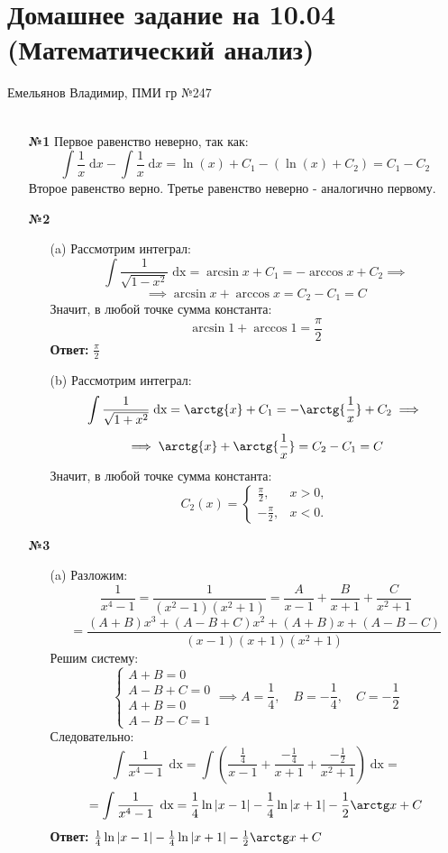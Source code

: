 \documentclass[a4paper]{article}
\renewcommand{\f}[2]{\frac{#1}{#2}}
\newcommand{\case}[1]{\begin{cases} #1 \end{cases}}
\renewcommand{\l}{\left(}
\renewcommand{\r}{\right)}
\renewcommand{\d}{\;\text{d}}
\newcommand{\dx}{\;\text{dx}}
\begin{document}
\section*{Домашнее задание на 10.04 (Математический анализ)}
 {\large Емельянов Владимир, ПМИ гр №247}\\\\
\begin{enumerate}
    \item[\textbf{№1}]Первое равенство неверно, так как:
    $$\int \f{1}{x} \d x - \int \f{1}{x} \d x= \ln(x) + C_1 - (\ln(x) + C_2) = C_1 - C_2$$
    Второе равенство верно. Третье равенство неверно - аналогично первому.

    \item[\textbf{№2}]\begin{enumerate}
        \item[(a)]Рассмотрим интеграл:
        $$\int \f{1}{\sqrt{1-x^2}} \dx = \arcsin{x} + C_1 = -\arccos{x} + C_2 \implies$$
        $$\implies \arcsin{x} + \arccos{x} = C_2 - C_1 = C$$
        Значит, в любой точке сумма константа:
        $$\arcsin{1} + \arccos{1} = \f{\pi}{2}$$
        \textbf{Ответ:} $\f{\pi}{2}$

        \item[(b)]Рассмотрим интеграл:
        $$\int \f{1}{\sqrt{1+x^2}} \dx = \arctg{x} + C_1 = -\arctg{\f{1}{x}} + C_2 \implies$$
        $$\implies \arctg{x} + \arctg{\f{1}{x}} = C_2 - C_1 = C$$
        Значит, в любой точке сумма константа:
        $$C_2(x) = \begin{cases} 
            \frac{\pi}{2}, & x > 0, \\
            -\frac{\pi}{2}, & x < 0.
        \end{cases}$$
    \end{enumerate}


    \item[\textbf{№3}]
    \begin{enumerate}
        \item[(a)]
        Разложим:
        \[
        \frac{1}{x^4 - 1} = \frac{1}{(x^2 - 1)(x^2 + 1)} = \frac{A}{x - 1} + \frac{B}{x + 1} + \frac{C}{x^2 + 1}
        \]
        \[
        =\frac{(A + B) x^3 + (A - B + C) x^2 + (A + B) x + (A - B - C)}{(x - 1)(x + 1)(x^2 + 1)}
        \]
        Решим систему:
        $$\case{
            A+B = 0\\
            A-B+C = 0\\
            A+B = 0\\
            A-B-C = 1
        } \implies A = \frac{1}{4}, \quad B = -\frac{1}{4}, \quad C = -\frac{1}{2}$$
        Следовательно:
        \[
        \int \frac{1}{x^4 - 1}\, \dx = \int \l \frac{\frac{1}{4}}{x - 1} + \frac{-\frac{1}{4}}{x + 1} + \frac{-\frac{1}{2}}{x^2 + 1}\r \dx =
        \]
        \[
        =\int \frac{1}{x^4 - 1} \, \dx = \frac{1}{4} \ln|x - 1| - \frac{1}{4} \ln|x + 1| - \frac{1}{2} \arctg x + C
        \]
        \textbf{Ответ: } $\frac{1}{4} \ln|x - 1| - \frac{1}{4} \ln|x + 1| - \frac{1}{2} \arctg x + C$\\
 

\end{enumerate}
\end{enumerate}
\end{document}
